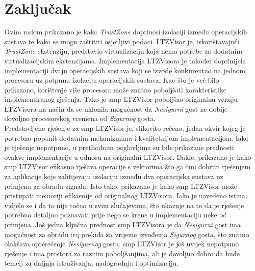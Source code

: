 \documentclass[times, utf8, diplomski, numeric]{fer}
\begin{document}
\chapter{Zaključak}
Ovim radom prikazano je kako \textit{TrustZone} doprinosi izolaciji između operacijskih sustava te kako se
mogu zaštititi osjetljivi podaci. LTZVisor je, iskorištavajući \textit{TrustZone} ekstenziju, predstavio virtualizaciju
koja nema potrebe za dodatnim virtualizacijskim ekstenzijama. Implementacija LTZVisora je također doprinijela
implementaciji dvaju operacijskih sustava koji se izvode konkurentno na jednom procesoru uz potpunu izolaciju
operacijskih sustava. Kao što je već bilo prikazano, korištenje više procesora može znatno poboljšati karakteristike
implementiranog rješenja. Tako je \gls{amp} LTZVisor poboljšao originalnu verziju LTZVisora na način da se uklonila mogućnost
da \textit{Nesigurni} gost ne dobije dovoljno procesorskog vremena od \textit{Sigurnog} gosta.\\
Predstavljeno rješenje za \gls{smp} LTZVisor je, slikovito rečeno, jedan okvir kojeg je potrebno popunit dodatnim mehanizmima
i kvalitetnijom implementacijom. Iako je rješenje nepotpuno, u prethodnim poglavljima su bile prikazane prednosti
ovakve implementacije u odnosu na originalni LTZVisor. Dakle, prikazano je kako \gls{smp} LTZVisor efikasno rješava
operacije s vektorima što ga čini dobrim rješenjem za aplikacije koje zahtijevaju izolaciju između dva operacijska
sustava uz primjenu za obradu signala. Isto tako, prikazano je kako \gls{smp} LTZVisor može pristupati memoriji efikasnije
od originalnog LTZVisora. Iako je navedeno istina, vidjelo se i da to nije točno u svim slučajevima, što ukazuje na to
da je rješenje potrebno detaljno poznavati prije nego se krene u implementaciju neke od primjena. Još jedna ključna prednost
\gls{smp} LTZVisora je da \textit{Nesigurni} gost ima mogućnost za obradu \gls{irq} prekida za vrijeme izvođenja \textit{Sigurnog}
gosta, što znatno olakšava opterećenje \textit{Nesigurnog} gosta.
\gls{smp} LTZVisor je još uvijek nepotpuno rješenje i ima prostora za raznim poboljšanjima, ali je dovoljno dobro da bude temelj
za daljnja istraživanja, nadogradnju i optimizaciju.




\end{document}
